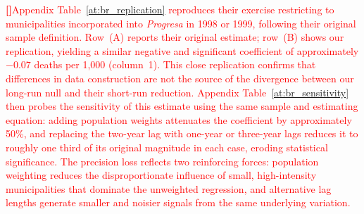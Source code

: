 \documentclass[12pt]{article}
\newcounter{paragraphnum}
\newcommand{\p}{\refstepcounter{paragraphnum}\textbf{[\theparagraphnum]}\enspace}
\begin{document}
\textcolor{red}{\p Appendix Table~\ref{at:br_replication} reproduces their exercise restricting to municipalities incorporated into \textit{Progresa} in 1998 or 1999, following their original sample definition. Row~(A) reports their original estimate; row~(B) shows our replication, yielding a similar negative and significant coefficient of approximately $-0.07$ deaths per 1,000 (column~1). This close replication confirms that differences in data construction are not the source of the divergence between our long-run null and their short-run reduction. Appendix Table~\ref{at:br_sensitivity} then probes the sensitivity of this estimate using the same sample and estimating equation: adding population weights attenuates the coefficient by approximately 50\%, and replacing the two-year lag with one-year or three-year lags reduces it to roughly one third of its original magnitude in each case, eroding statistical significance. The precision loss reflects two reinforcing forces: population weighting reduces the disproportionate influence of small, high-intensity municipalities that dominate the unweighted regression, and alternative lag lengths generate smaller and noisier signals from the same underlying variation.}
\end{document}
